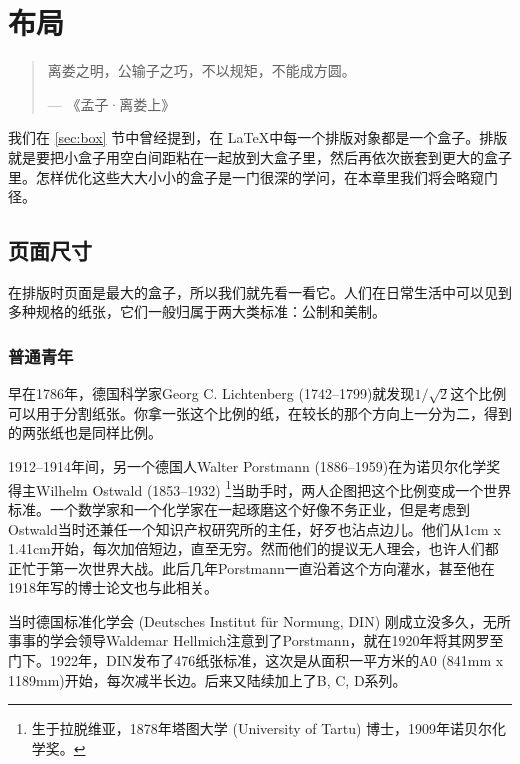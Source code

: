 \chapter{布局}

\begin{quotation}
离娄之明，公输子之巧，不以规矩，不能成方圆。
\begin{flushright}
--- 《孟子·离娄上》
\end{flushright}
\end{quotation}

我们在 \ref{sec:box} 节中曾经提到，在 \LaTeX 中每一个排版对象都是一个盒子。排版就是要把小盒子用空白间距粘在一起放到大盒子里，然后再依次嵌套到更大的盒子里。怎样优化这些大大小小的盒子是一门很深的学问，在本章里我们将会略窥门径。

\section{页面尺寸}

在排版时页面是最大的盒子，所以我们就先看一看它。人们在日常生活中可以见到多种规格的纸张，它们一般归属于两大类标准：公制和美制。

\subsection{普通青年}

早在1786年，德国科学家Georg C. Lichtenberg (1742--1799)\indexLichtenberg 就发现$1/\sqrt{2}$这个比例可以用于分割纸张。你拿一张这个比例的纸，在较长的那个方向上一分为二，得到的两张纸也是同样比例。

1912--1914年间，另一个德国人Walter Porstmann (1886--1959)\indexPorstmann 在为诺贝尔化学奖得主Wilhelm Ostwald (1853--1932)\indexOstwald{} \footnote{生于拉脱维亚，1878年塔图大学 (University of Tartu) 博士，1909年诺贝尔化学奖。}当助手时，两人企图把这个比例变成一个世界标准。一个数学家和一个化学家在一起琢磨这个好像不务正业，但是考虑到Ostwald当时还兼任一个知识产权研究所的主任，好歹也沾点边儿。他们从1cm x 1.41cm开始，每次加倍短边，直至无穷。然而他们的提议无人理会，也许人们都正忙于第一次世界大战。此后几年Porstmann一直沿着这个方向灌水，甚至他在1918年写的博士论文也与此相关。

当时德国标准化学会 (Deutsches Institut für Normung, DIN) 刚成立没多久，无所事事的学会领导Waldemar Hellmich\indexHellmich{}注意到了Porstmann，就在1920年将其网罗至门下。1922年，DIN发布了476纸张标准，这次是从面积一平方米的A0 (841mm x 1189mm)开始，每次减半长边。后来又陆续加上了B, C, D系列。


